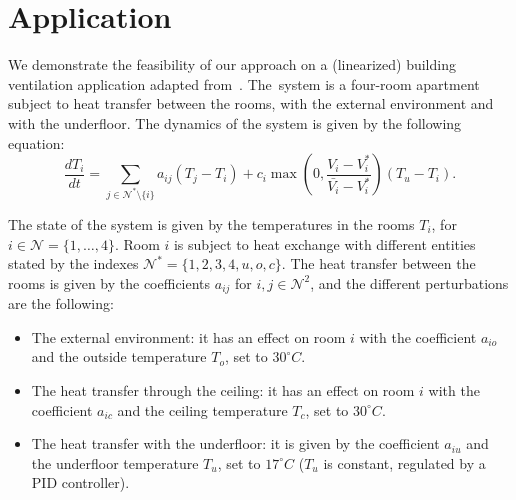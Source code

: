  \section{Application}\label{sec:application}

We demonstrate the feasibility of our approach on a (linearized) building
ventilation application adapted from~\cite{meyer:tel-01232640}.
The~system is a four-room apartment subject to heat transfer between
the rooms, with the external environment and with the underfloor.
The dynamics of the system is given by the
following equation:
\begin{equation}
 \frac{d T_i}{dt} = \sum_{j \in \mathcal{N}^\text{*}\setminus \{i\}} a_{ij} (T_j -
 T_i)
 + c_i
 \max\left(0,\frac{V_i - V_i^\text{*}}{\bar{ V_i} -
   V_i^{\text{*}}}\right)(T_u - T_i).
\end{equation}

The state of the system is given by the temperatures in the rooms
$T_i$, for $i \in \mathcal{N} = \{ 1 , \dots , 4 \}$.  Room $i$ is
subject to heat exchange with different entities stated by the indexes
$\mathcal{N}^\text{*} = \{1,2,3,4,u,o,c \}$.
%
The heat
transfer between the rooms is given by the coefficients $a_{ij}$ for
$i,j \in  \mathcal{N}^2$, and the different perturbations are the following:
\begin{itemize}
 \item The external environment: it has an effect on room $i$ with the
   coefficient $a_{io}$ and the outside temperature $T_o$, set to $30^\circ C$.
  \item The heat transfer through the ceiling: it has an effect on
    room $i$ with the coefficient $a_{ic}$ and the ceiling temperature
    $T_c$, set to $30^\circ C$.
  \item The heat transfer with the underfloor: it is given by the
    coefficient $a_{iu}$ and the underfloor temperature $T_u$, set to
    $17^\circ C$ ($T_u$ is constant, regulated by a PID controller).
\end{itemize}

